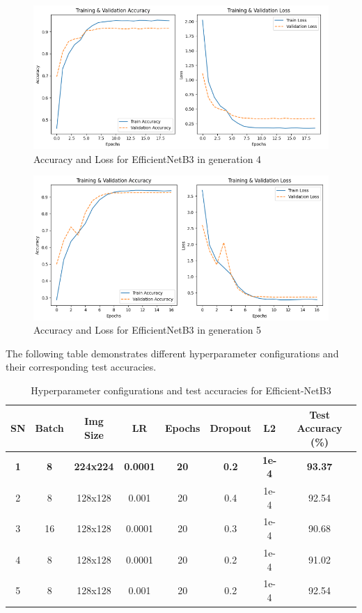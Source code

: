 \begin{figure}[htbp]
      \centering
      \includegraphics[scale=0.45]{images/GA_EfficientNet4.png}
      \caption{Accuracy and Loss for EfficientNetB3 in generation 4}
\end{figure}
\begin{figure}[htbp]
      \centering
      \includegraphics[scale=0.45]{images/GA_EfficientNet5.png}
      \caption{Accuracy and Loss for EfficientNetB3 in generation 5}
\end{figure}

\clearpage 

The following table demonstrates different hyperparameter configurations and their corresponding test accuracies.

\begin{table}[h!]
      \centering
      \begin{tabular}{|c|c|c|c|c|c|c|c|}
          \hline
          \textbf{SN} & 
          \textbf{Batch} & \textbf{Img Size} & \textbf{LR} & \textbf{Epochs} & \textbf{Dropout} & \textbf{L2} & \textbf{Test Accuracy (\%)} \\
          \hline
          \textbf{1} & \textbf{8}   & \textbf{224x224} & \textbf{0.0001}  & \textbf{20}  & \textbf{0.2}  & \textbf{1e-4}  & \textbf{93.37} \\
          2 & 8   & 128x128 & 0.001   & 20  & 0.4  & 1e-4  & 92.54 \\
          3 & 16  & 128x128 & 0.0001  & 20  & 0.3  & 1e-4  & 90.68 \\
          4 & 8   & 128x128 & 0.0001  & 20  & 0.2  & 1e-4  & 91.02 \\
          5 & 8   & 128x128 & 0.001   & 20  & 0.2  & 1e-4  & 92.54 \\
          \hline
      \end{tabular}
      \caption{Hyperparameter configurations and test accuracies for Efficient-NetB3}
\end{table}

